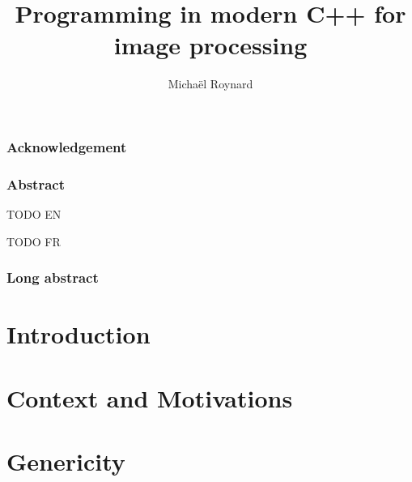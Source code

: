 \documentclass[11pt]{book}
\begin{document}
%
\title{Programming in modern C++ for image processing}


\author{Michaël Roynard}



\maketitle

\section{Acknowledgement}
\label{sec.acknowledgement}


\section{Abstract}
\label{sec.abstract}
TODO EN

TODO FR

\section{Long abstract}
\label{sec.long_abstract}


\tableofcontents
\label{table.of.contents}

\listoffigures
\label{list.of.figures}

\listoftables
\label{list.of.tables}

\cleardoublepage


\part{Introduction}
\label{part.introduction}



\cleardoublepage


\part{Context and Motivations}
\label{part.context_and_Motivations}



\cleardoublepage


\part{Genericity}
\label{part.genericity}
\end{document}
